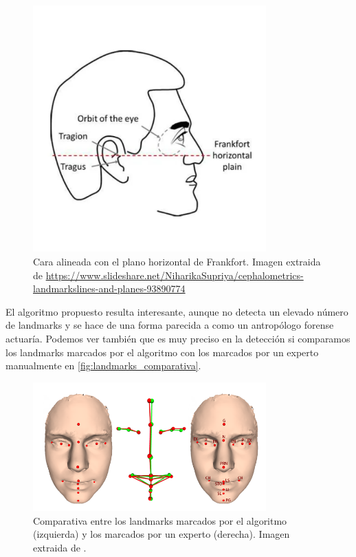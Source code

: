                 \begin{figure}[!h]
                    \centering
                    \includegraphics[width=0.8\textwidth]{img/frankfort.png}
                    \caption{Cara alineada con el plano horizontal de Frankfort. Imagen extraida de \url{https://www.slideshare.net/NiharikaSupriya/cephalometrics-landmarkslines-and-planes-93890774
                    }}
                    \label{fig:Frankfort}
                \end{figure}

                \medskip

                \noindent El algoritmo propuesto resulta interesante, aunque no detecta un elevado número de landmarks y se hace de una forma parecida a como un antropólogo forense actuaría. Podemos ver también que es muy preciso en la detección si comparamos los landmarks marcados por el algoritmo con los marcados por un experto manualmente en \autoref{fig:landmarks_comparativa}.


                \begin{figure}[!h]
                    \centering
                    \includegraphics[width=0.8\textwidth]{img/comparativa_landmarks.png}
                    \caption{Comparativa entre los landmarks marcados por el algoritmo (izquierda) y los marcados por un experto (derecha). Imagen extraida de \cite{galvanek2015automated}.}
                    \label{fig:landmarks_comparativa}
                \end{figure}


